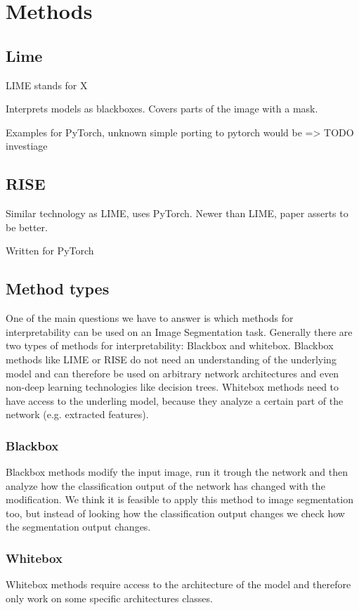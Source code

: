 \chapter{Methods}
\section{Lime}
LIME\cite{todo} stands for X

Interprets models as blackboxes. Covers parts of the image with a mask.

Examples for PyTorch, unknown simple porting to pytorch would be => TODO investiage


\section{RISE}
Similar technology as LIME, uses PyTorch. Newer than LIME, paper asserts to be better.

Written for PyTorch





\section{Method types}
One of the main questions we have to answer is which methods for interpretability can be used on an Image Segmentation task.
Generally there are two types of methods for interpretability: Blackbox and whitebox.
Blackbox methods like LIME or RISE do not need an understanding of the underlying model and can therefore be used on arbitrary network architectures and even non-deep learning technologies like decision trees.
Whitebox methods need to have access to the underling model, because they analyze a certain part of the network (e.g. extracted features).

\subsection{Blackbox}
Blackbox methods modify the input image, run it trough the network and then analyze how the classification output of the network has changed with the modification.
We think it is feasible to apply this method to image segmentation too, but instead of looking how the classification output changes we check how the segmentation
output changes.

\subsection{Whitebox}
Whitebox methods require access to the architecture of the model and therefore only work on some specific architectures classes.

